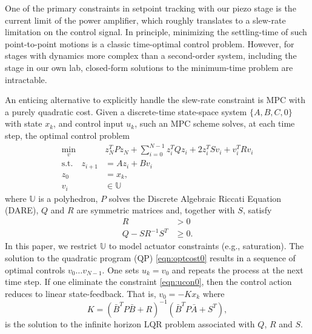 \documentclass[twocolumn,twoside]{IEEEtran}
\newcommand{\Ad}{\ensuremath{\bar A }\xspace}
\newcommand{\Bd}{\ensuremath{\bar B }\xspace}
\begin{document}
One of the primary constraints in setpoint tracking with our piezo stage is the current limit of the power amplifier,  which roughly translates to a slew-rate limitation on the control signal.
In principle, minimizing the settling-time of such point-to-point motions is a classic time-optimal control problem. %
However, for stages with dynamics more complex than a second-order system,  including the stage in our own lab, closed-form solutions to the minimum-time problem are intractable. 

An enticing alternative to explicitly handle the slew-rate constraint is MPC with a purely quadratic cost. 
Given a discrete-time state-space system $\{A,B,C,0\}$ with state $x_k$, and control input $u_k$, such an MPC scheme solves, at each time step, the optimal control problem 
\begin{subequations}
\begin{align}
\min_{v}\:\:& z^T_{N}Pz_{N} + \sum_{i=0}^{N-1}z_{i}^{T}Qz_{i} + 2z^T_iSv_i + v^{T}_{i}Rv_{i} \\
 \text{s.t.} \quad z_{i+1} &= A z_{i} + B v_{i}\\
z_{0} &= x_{k}, \\
v_i  &\in \mathds{U} \label{eqn:ucon0}
\end{align}\label{eqn:optcost0}%
\end{subequations}
where $\mathds{U}$ is a polyhedron, $P$ solves the Discrete Algebraic Riccati Equation (DARE), $Q$ and $R$ are symmetric matrices and, together with $S$, satisfy
\begin{align}
  R &> 0 \label{eqn:schur0}\\
  Q - SR^{-1}S^T &\geq 0. \label{eqn:schur1}
\end{align}
In this paper, we restrict $\mathds{U}$ to model actuator constraints (e.g., saturation). The solution to the quadratic program (QP) \eqref{eqn:optcost0} results in a sequence of optimal controls $v_0\dots v_{N-1}$. One sets $u_k = v_0$ and repeats the process at the next time step. If one eliminate the constraint \eqref{eqn:ucon0}, then the control action reduces to linear state-feedback. That is, $v_0=-Kx_k$ where
\begin{equation}
  K = (\Bd^TP\Bd + R)^{-1}(\Bd^TP\Ad + S^T),\label{eqn:klin0}
\end{equation}
is the solution to the infinite horizon LQR problem associated with $Q$, $R$ and $S$. 
\end{document}
